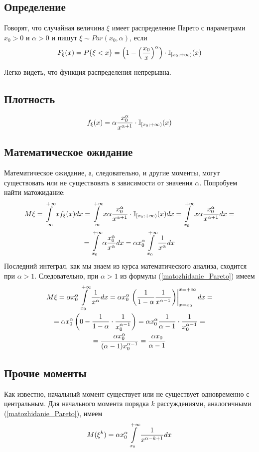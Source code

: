 \subsection{Определение}
\opred
Говорят, что случайная величина $\xi$ имеет распределение Парето с параметрами $x_0>0$ и $\alpha>0$ и пишут $\xi \sim Par(x_0,\alpha)$, если
$$
F_\xi (x) = P\{\xi < x\} = \left(1 - \left(\frac{x_0}{x}\right)^\alpha\right) \cdot \mathbb{I}_{[x_0; +\infty)}(x)
$$

Легко видеть, что функция распределения непрерывна.
\subsection{Плотность}
$$
f_\xi (x) = \alpha\frac{x_0^\alpha}{x^{\alpha+1}} \cdot \mathbb{I}_{[x_0; +\infty)}(x)
$$

\subsection{Математическое ожидание}
Математическое ожидание, а, следовательно, и другие моменты, могут существовать или не существовать в зависимости от значения $\alpha$.
Попробуем найти матожидание:
\begin{multline}\label{matozhidanie_Pareto}
M\xi=
\int\limits_{-\infty}^{+\infty}x f_\xi(x) dx =
\int\limits_{-\infty}^{+\infty}x \alpha \frac{x_0^\alpha}{x^{\alpha+1}} \cdot \mathbb{I}_{[x_0; +\infty)}(x) dx =
\int\limits_{x_0}^{+\infty}x \alpha\frac{x_0^\alpha}{x^{\alpha+1}} dx =
\\=
\int\limits_{x_0}^{+\infty} \alpha\frac{x_0^\alpha}{x^\alpha} dx = 
\alpha x_0^\alpha \int\limits_{x_0}^{+\infty} \frac{1}{x^\alpha} dx
\end{multline}
Последний интеграл, как мы знаем из курса математического анализа, сходится при $\alpha>1$.
Следовательно, при $\alpha>1$ из формулы (\ref{matozhidanie_Pareto}) имеем
\begin{multline}\label{matozhidanie_Pareto_itog}
M\xi = 
\alpha x_0^\alpha \int\limits_{x_0}^{+\infty} \frac{1}{x^\alpha} dx =
\alpha x_0^\alpha \left.\left(\frac{1}{1-\alpha}\frac{1}{x^{\alpha-1}}\right)\right|_{x=x_0}^{x=+\infty} dx =
\\=
\alpha x_0^\alpha\left(0-\frac{1}{1-\alpha}\cdot\frac{1}{x_0^{\alpha-1}}\right)=
\alpha x_0^\alpha\frac{1}{\alpha-1}\cdot\frac{1}{x_0^{\alpha-1}}=
\\=
\frac{\alpha x_0^\alpha}{(\alpha-1)x_0^{\alpha-1}}=
\frac{\alpha x_0}{\alpha-1}
\end{multline}

\subsection{Прочие моменты}
Как известно, начальный момент существует или не существует одновременно с центральным.
Для начального момента порядка $k$ рассуждениями, аналогичными (\ref{matozhidanie_Pareto}), имеем
\begin{equation}\label{momenty_Pareto}
M(\xi^k)= \alpha x_0^\alpha \int\limits_{x_0}^{+\infty} \frac{1}{x^{\alpha-k+1}} dx
\end{equation}

